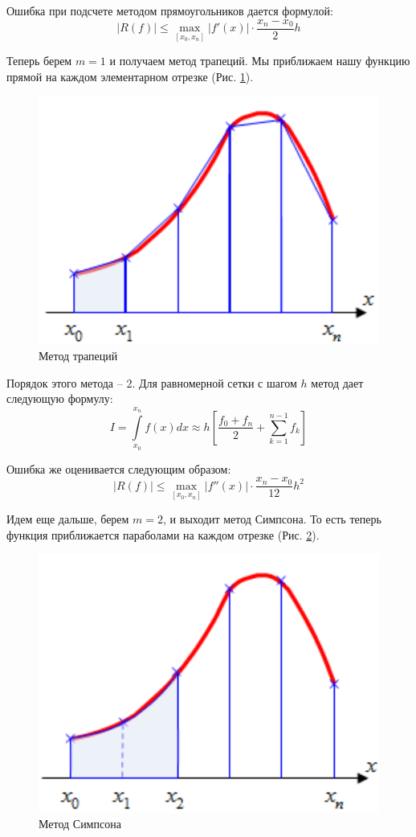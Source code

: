 		Ошибка при подсчете методом прямоугольников дается формулой:
		\begin{equation}
			|R(f)| \leqslant \max\limits_{[x_0, x_n]}|f'(x)| \cdot \frac{x_n - x_0}{2}h
		\end{equation}
	
		
		\newpage
		Теперь берем $m = 1$ и получаем метод трапеций. Мы приближаем нашу функцию прямой на каждом элементарном отрезке (Рис. \ref{Trapez}).
		\begin{figure}[h!]
			\centering
			\includegraphics[width=0.65\linewidth]{Pictures/Trapez}
			\caption{Метод трапеций}
			\label{Trapez}
		\end{figure}
		
		Порядок этого метода -- 2. Для равномерной сетки с шагом $h$ метод дает следующую формулу:
		\begin{equation}
			I = \int\limits_{x_0}^{x_n} f(x) dx \approx h\left[\frac{f_0 + f_n}{2} + \sum\limits_{k = 1}^{n-1} f_k\right]
		\end{equation}
	
		Ошибка же оценивается следующим образом:
		\begin{equation}
			|R(f)| \leqslant \max\limits_{[x_0, x_n]}|f''(x)| \cdot \frac{x_n - x_0}{12}h^2
		\end{equation}
	
	
		\newpage
		Идем еще дальше, берем $m = 2$, и выходит метод Симпсона. То есть теперь функция приближается параболами на каждом отрезке (Рис. \ref{Simpson}).
		\begin{figure}[h!]
			\centering
			\includegraphics[width=0.65\linewidth]{Pictures/Simpson}
			\caption{Метод Симпсона}
			\label{Simpson}
		\end{figure}
		
